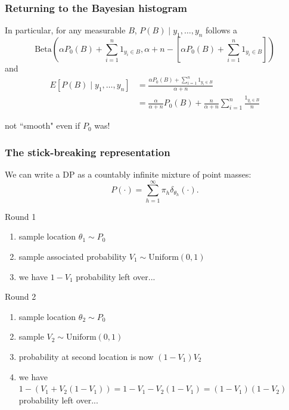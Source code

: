 \documentclass{beamer}
\begin{document}
\begin{frame}
\frametitle{Returning to the Bayesian histogram}

In particular, for any measurable $B$, $P(B)\mid y_1, \ldots, y_n$ follows a 
$$
\text{Beta}\left(\alpha P_0(B) + \sum_{i=1}^n 1_{y_i \in B},  \alpha + n -  \left[ \alpha P_0(B) + \sum_{i=1}^n 1_{y_i \in B} \right] \right)
$$
and
\begin{align*}
E[P(B) \mid y_1, \ldots, y_n ] 
&= \frac{\alpha P_0(B) + \sum_{i=1}^n 1_{y_i \in B}}{\alpha + n} \\
&= \frac{\alpha }{\alpha + n}P_0(B)  + \frac{n}{\alpha + n}\sum_{i=1}^n \frac{1_{y_i \in B}}{n}
\end{align*}
\pause

not ``smooth" even if $P_0$ was!

\end{frame}

\begin{frame}
\frametitle{The stick-breaking representation}

We can write a DP as a countably infinite mixture of point masses:
$$
P(\cdot) = \sum_{h=1}^{\infty} \pi_h \delta_{\theta_h}(\cdot).
$$

Round 1
\begin{enumerate}
\item sample location $\theta_1 \sim P_0$
\item sample associated probability $V_1 \sim \text{Uniform}(0,1)$
\item we have $1-V_1$ probability left over...
\end{enumerate}
\pause

Round 2
\begin{enumerate}
\item sample location $\theta_2 \sim P_0$
\item sample $V_2 \sim \text{Uniform}(0,1)$
\item probability at second location is now $(1-V_1)V_2$
\item we have $1-(V_1 + V_2(1-V_1)) = 1-V_1 - V_2(1-V_1) = (1-V_1)(1-V_2)$ probability left over...
\end{enumerate}

\end{frame}
\end{document}
